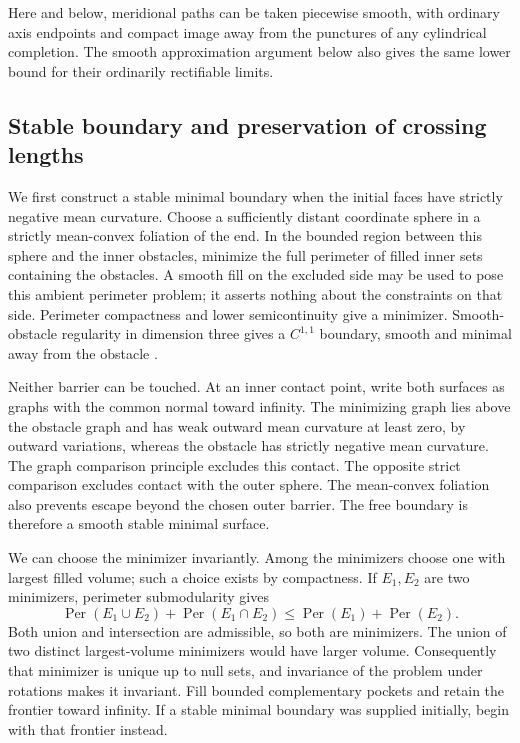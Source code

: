 Here and below, meridional paths can be taken piecewise smooth, with
ordinary axis endpoints and compact image away from the punctures of
any cylindrical completion.  The smooth approximation argument below
also gives the same lower bound for their ordinarily rectifiable limits.

\subsection{Stable boundary and preservation of crossing lengths}
\label{r:hulls}

We first construct a stable minimal boundary when the initial faces have
strictly negative mean curvature.  Choose a sufficiently distant coordinate
sphere in a strictly mean-convex foliation of the end.  In the bounded
region between this sphere and the inner obstacles, minimize the full
perimeter of filled inner sets containing the obstacles.  A smooth fill
on the excluded side may be used to pose this ambient perimeter problem;
it asserts nothing about the constraints on that side.  Perimeter
compactness and lower semicontinuity give a minimizer.  Smooth-obstacle
regularity in dimension three gives a $C^{1,1}$ boundary, smooth and
minimal away from the obstacle
\cite[Regularity Theorem~1.3(iii)]{HuiskenIlmanen2001}.

Neither barrier can be touched.  At an inner contact point, write both
surfaces as graphs with the common normal toward infinity.  The minimizing
graph lies above the obstacle graph and has weak outward mean curvature
at least zero, by outward variations, whereas the obstacle has strictly
negative mean curvature.  The graph comparison principle excludes this
contact.  The opposite strict comparison excludes contact with the outer
sphere.  The mean-convex foliation also prevents escape beyond the chosen
outer barrier.  The free boundary is therefore a smooth stable minimal
surface.

We can choose the minimizer invariantly.  Among the minimizers choose one
with largest filled volume; such a choice exists by compactness.  If
$E_1,E_2$ are two minimizers, perimeter submodularity gives
\[
 \operatorname{Per}(E_1\cup E_2)+\operatorname{Per}(E_1\cap E_2)
 \le \operatorname{Per}(E_1)+\operatorname{Per}(E_2).
\]
Both union and intersection are admissible, so both are minimizers.
The union of two distinct largest-volume minimizers would have larger
volume.  Consequently that minimizer is unique up to null sets, and
invariance of the problem under rotations makes it invariant.  Fill
bounded complementary pockets and retain the frontier toward infinity.
If a stable minimal boundary was supplied initially, begin with that
frontier instead.

